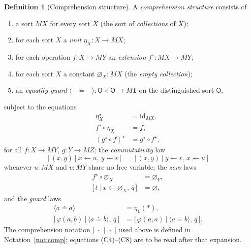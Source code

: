 \documentclass[11pt]{article}
\theoremstyle{definition}
\newtheorem{definition}{Definition}[section]
\theoremstyle{plain}
\newcommand{\Ob}{\mathsf{O}}            %
\newcommand{\M}{M}                      %
\newcommand{\unit}{\eta}                %
\newcommand{\zero}{\varnothing}         %
\newcommand{\guard}[1]{\langle #1\rangle}
\newcommand{\eq}{\mathrel{\doteq}}      %
\newcommand{\gen}[2]{#1\!\leftarrow\!#2}%
\newcommand{\one}{\mathbf{1}}           %
\newcommand{\pt}{\ast}                  %
\newcommand{\id}{\mathrm{id}}
\newcommand{\compr}[2]{\bigl[\,#1 \ \big|\ #2\,\bigr]}
\begin{document}
\begin{definition}[Comprehension structure]\label{def:comp}
A \emph{comprehension structure} consists of
\begin{enumerate}[label=(\roman*)]
  \item a sort $\M X$ for every sort $X$ (the sort of \emph{collections} of $X$);
  \item for each sort $X$ a \emph{unit} $\unit_X\colon X\to\M X$;
  \item for each operation $f\colon X\to\M Y$ an \emph{extension}
        $f^{\star}\colon \M X\to\M Y$;
  \item for each sort $X$ a constant $\zero_X\colon\M X$ (the \emph{empty
        collection});
  \item an \emph{equality guard}
        $\guard{-\eq-}\colon \Ob\times\Ob\to\M\one$
        on the distinguished sort $\Ob$,
\end{enumerate}
subject to the equations
\begin{align}
  \unit_X^{\star} &= \id_{\M X}, \tag{C1}\\
  f^{\star}\circ\unit_X &= f, \tag{C2}\\
  (g^{\star}\circ f)^{\star} &= g^{\star}\circ f^{\star}, \tag{C3}
\end{align}
for all $f\colon X\to\M Y$, $g\colon Y\to\M Z$; the \emph{commutativity} law
\begin{equation}
  \compr{(x,y)}{\gen{x}{u},\,\gen{y}{v}}
  \;=\;
  \compr{(x,y)}{\gen{y}{v},\,\gen{x}{u}}
  \tag{C4}
\end{equation}
whenever $u\colon\M X$ and $v\colon\M Y$ share no free variable; the \emph{zero}
laws
\begin{align}
  f^{\star}\circ\zero_X &= \zero_Y, \tag{C5}\\
  \compr{t}{\gen{x}{\zero_X},\,\overline{q}} &= \zero, \tag{C6}
\end{align}
and the \emph{guard} laws
\begin{align}
  \guard{a\eq a} &= \unit_{\one}(\pt), \tag{C7}\\
  \compr{\varphi(a,b)}{\guard{a\eq b},\,\overline{q}}
  &= \compr{\varphi(a,a)}{\guard{a\eq b},\,\overline{q}}. \tag{C8}
\end{align}
The comprehension notation $\compr{\,\cdot\,}{\,\cdot\,}$ used above is defined in
Notation~\ref{not:comp}; equations (C4)--(C8) are to be read after that
expansion.
\end{definition}
\end{document}
